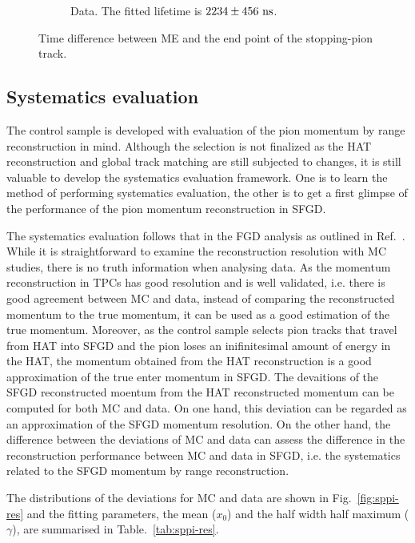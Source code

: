 \begin{figure}
\begin{subfigure}{\dbfigwid\textwidth}
                    \caption{Data. The fitted lifetime is $2234\pm456~\textrm{ns}$.}
                    \label{subfig:sppi-me-data}
               \end{subfigure}
               \caption{Time difference between ME and the end point of the stopping-pion track.}
               \label{fig:sppi-me-td}
          \end{figure}

          \subsection{Systematics evaluation}
          \label{sec:sppi-syst}
          The control sample is developed with evaluation of the pion momentum by range reconstruction in mind.
          Although the selection is not finalized as the HAT reconstruction and global track matching are still subjected to changes, it is still valuable to develop the systematics evaluation framework.
          One is to learn the method of performing systematics evaluation, the other is to get a first glimpse of the performance of the pion momentum reconstruction in SFGD.

          The systematics evaluation follows that in the FGD analysis as outlined in Ref.~\cite{Jenkins:2022ljx}.
          While it is straightforward to examine the reconstruction resolution with MC studies, there is no truth information when analysing data.
          As the momentum reconstruction in TPCs has good resolution and is well validated, i.e. there is good agreement between MC and data, instead of comparing the reconstructed momentum to the true momentum, it can be used as a good estimation of the true momentum.
          Moreover, as the control sample selects pion tracks that travel from HAT into SFGD and the pion loses an inifinitesimal amount of energy in the HAT, the momentum obtained from the HAT reconstruction is a good approximation of the true enter momentum in SFGD.
          The devaitions of the SFGD reconstructed moentum from the HAT reconstructed momentum can be computed for both MC and data.
          On one hand, this deviation can be regarded as an approximation of the SFGD momentum resolution.
          On the other hand, the difference between the deviations of MC and data can assess the difference in the reconstruction performance between MC and data in SFGD, i.e. the systematics related to the SFGD momentum by range reconstruction.

          The distributions of the deviations for MC and data are shown in Fig.~\ref{fig:sppi-res} and the fitting parameters, the mean ($x_0$) and the half width half maximum ($\gamma$), are summarised in Table.~\ref{tab:sppi-res}.

